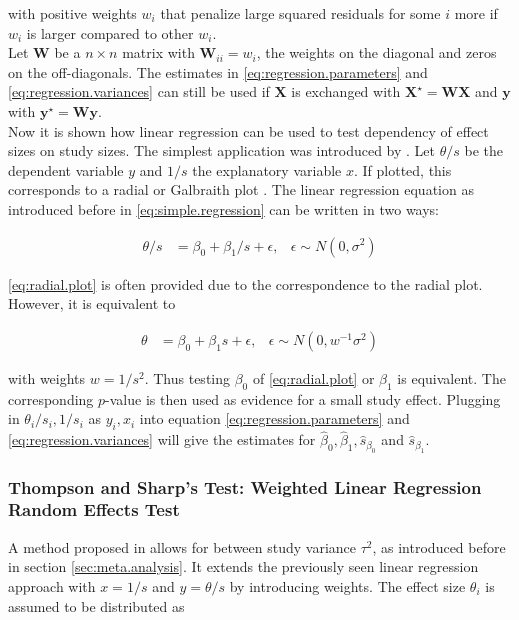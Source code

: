 \documentclass[11pt,a4paper,twoside]{book}\usepackage[]{graphicx}\usepackage[]{color}
\begin{document}
with positive weights $w_i$ that penalize large squared residuals for some $i$ more if $w_i$ is larger compared to other $w_i$. \\
Let $\mathbf{W}$ be a $n \times n$ matrix with $\mathbf{W}_{ii} = w_i$, the weights on the diagonal and zeros on the off-diagonals. The estimates in \ref{eq:regression.parameters} and \ref{eq:regression.variances} can still be used if $\mathbf{X}$ is exchanged with $\mathbf{X}^\star =  \mathbf{W} \mathbf{X}$ and $\mathbf{y}$ with $\mathbf{y}^\star = \mathbf{W} \mathbf{y}$. \label{weighted.regression} \\
Now it is shown how linear regression can be used to test dependency of effect sizes on study sizes. The simplest application was introduced by \citet{Egger}.
Let $\theta/s$ be the dependent variable $y$ and $1/s$ the explanatory variable $x$. If plotted, this corresponds to a radial or Galbraith plot \citet{galbraith}. The linear regression equation as introduced before in \ref{eq:simple.regression} can be written in two ways:

\begin{align}
\theta/s &= \beta_0 + \beta_1/s + \epsilon, & \epsilon \sim N(0, \sigma^2) \label{eq:radial.plot} 
\end{align}

\ref{eq:radial.plot} is often provided due to the correspondence to the radial plot. However, it is equivalent to

\begin{align}
\theta &= \beta_0 + \beta_1 s + \epsilon, & \epsilon \sim N(0, w^{-1}\sigma^2) \label{eq:egger.plot}
\end{align}

with weights $w = 1/s^2$. Thus testing $\beta_0$ of \ref{eq:radial.plot} or $\beta_1$ is equivalent. The corresponding $p$-value is then used as evidence for a small study effect. Plugging in  $\theta_i/s_i, 1/s_i$ as $y_i, x_i$ into equation \ref{eq:regression.parameters} and \ref{eq:regression.variances} will give the estimates for $\hat{\beta}_0, \hat{\beta}_1,\hat{s}_{\beta_0}$ and $\hat{s}_{\beta_1}$.



\subsubsection{Thompson and Sharp's Test: Weighted Linear Regression Random Effects Test} \label{sec:Thompson}
A method proposed in \citet{thompson.sharp} allows for between study variance $\tau^2$, as introduced before in section \ref{sec:meta.analysis}. It extends the previously seen linear regression approach with $x = 1/s$ and $y = \theta/s$ by introducing weights. The effect size $\theta_i$ is assumed to be distributed as
\end{document}
